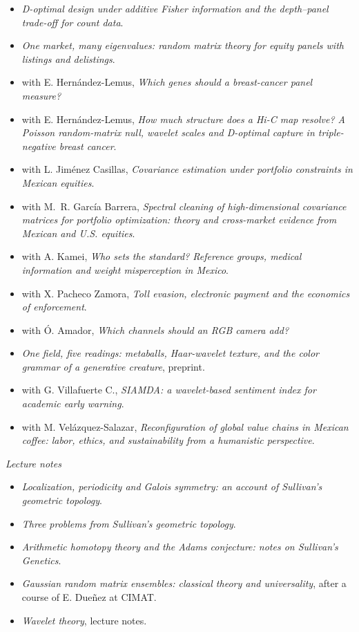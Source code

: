 \documentclass[10pt,a4paper]{article}
\begin{document}
\begin{itemize}
\item \emph{D-optimal design under additive Fisher information and the depth--panel trade-off for count data}.
\item \emph{One market, many eigenvalues: random matrix theory for equity panels with listings and delistings}.
\item with E. Hernández-Lemus, \emph{Which genes should a breast-cancer panel measure?}
\item with E. Hernández-Lemus, \emph{How much structure does a Hi-C map resolve? A Poisson random-matrix null, wavelet scales and D-optimal capture in triple-negative breast cancer}.
\item with L. Jiménez Casillas, \emph{Covariance estimation under portfolio constraints in Mexican equities}.
\item with M.~R. García Barrera, \emph{Spectral cleaning of high-dimensional covariance matrices for portfolio optimization: theory and cross-market evidence from Mexican and U.S. equities}.
\item with A. Kamei, \emph{Who sets the standard? Reference groups, medical information and weight misperception in Mexico}.
\item with X. Pacheco Zamora, \emph{Toll evasion, electronic payment and the economics of enforcement}.
\item with Ó. Amador, \emph{Which channels should an RGB camera add?}
\item \emph{One field, five readings: metaballs, Haar-wavelet texture, and the color grammar of a generative creature}, preprint.
\item with G. Villafuerte C., \emph{SIAMDA: a wavelet-based sentiment index for academic early warning}.
\item with M. Velázquez-Salazar, \emph{Reconfiguration of global value chains in Mexican coffee: labor, ethics, and sustainability from a humanistic perspective}.
\end{itemize}
\textit{Lecture notes}
\begin{itemize}
\item \emph{Localization, periodicity and Galois symmetry: an account of Sullivan's geometric topology}.
\item \emph{Three problems from Sullivan's geometric topology}.
\item \emph{Arithmetic homotopy theory and the Adams conjecture: notes on Sullivan's Genetics}.
\item \emph{Gaussian random matrix ensembles: classical theory and universality}, after a course of E. Dueñez at CIMAT.
\item \emph{Wavelet theory}, lecture notes.
\end{itemize}
\end{document}
